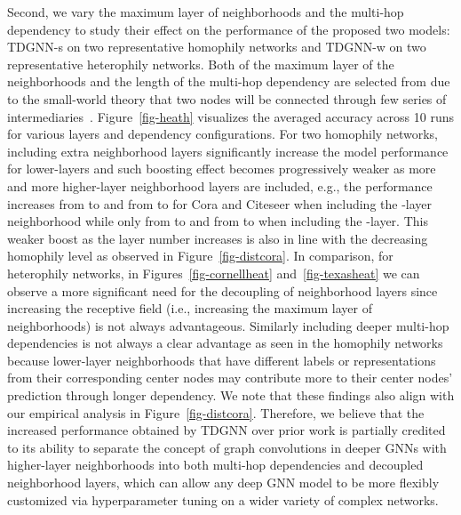 Second, we vary the maximum layer of neighborhoods and the multi-hop dependency to study their effect on the performance of the proposed two models: TDGNN-s on two representative homophily networks and TDGNN-w on two representative heterophily networks. Both of the maximum layer of the neighborhoods and the length of the multi-hop dependency are selected from  due to the small-world theory that two nodes will be connected through few series of intermediaries~\cite{milgram1967small}. Figure~\ref{fig-heath} visualizes the averaged accuracy across 10 runs for various layers and dependency configurations. For two homophily networks, including extra neighborhood layers significantly increase the model performance for lower-layers and such boosting effect becomes progressively weaker as more and more higher-layer neighborhood layers are included, e.g., the performance increases from  to  and from  to  for Cora and Citeseer when including the -layer neighborhood while only from  to  and from  to  when including the -layer. This weaker boost as the layer number increases is also in line with the decreasing homophily level as observed in Figure~\ref{fig-distcora}. In comparison, for heterophily networks, in Figures~\ref{fig-cornellheat} and~\ref{fig-texasheat} we can observe a more significant need for the decoupling of neighborhood layers since increasing the receptive field (i.e., increasing the maximum layer of neighborhoods) is not always advantageous. Similarly including deeper multi-hop dependencies is not always a clear advantage as seen in the homophily networks because lower-layer neighborhoods that have different labels or representations from their corresponding center nodes may contribute more to their center nodes' prediction through longer dependency. We note that these findings also align with our empirical analysis in Figure~\ref{fig-distcora}.
Therefore, we believe that the increased performance obtained by TDGNN over prior work is partially credited to its ability to separate the concept of graph convolutions in deeper GNNs with higher-layer neighborhoods into both multi-hop dependencies and decoupled neighborhood layers, which can allow any deep GNN model to be more flexibly customized via hyperparameter tuning on a wider variety of complex networks.



